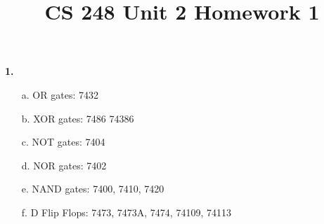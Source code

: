 \documentclass[12pt]{article}
\title{CS 248 Unit 2 Homework 1}
\begin{document}
    \bf{1.}
    \begin{itemize}
        \item[a.] OR gates: 7432
        \item[b.] XOR gates: 7486 74386
        \item[c.] NOT gates: 7404
        \item[d.] NOR gates: 7402
        \item[e.] NAND gates: 7400, 7410, 7420
        \item[f.] D Flip Flops: 7473, 7473A, 7474, 74109, 74113
    \end{itemize}
\end{document}
